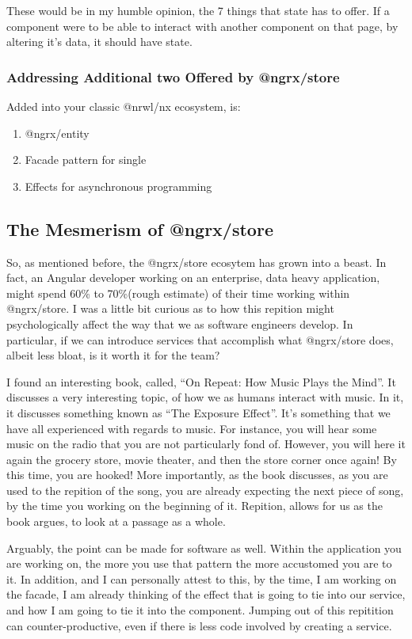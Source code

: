 These would be in my humble opinion, the 7 things that state has to offer. If a
component were to be able to interact with another component on that page, by
altering it's data, it should have state.

\subsubsection{ Addressing Additional two Offered by @ngrx/store }
Added into your classic @nrwl/nx ecosystem, is:
\begin{enumerate}
  \item @ngrx/entity
  \item Facade pattern for single
  \item Effects for asynchronous programming
\end{enumerate}

\subsection{The Mesmerism of @ngrx/store}

So, as mentioned before, the @ngrx/store ecosytem has grown into a beast. In
fact, an Angular developer working on an enterprise, data heavy application,
might spend 60\% to 70\%(rough estimate) of their time working within
@ngrx/store. I was a little bit curious as to how this repition might
psychologically affect the way that we as software engineers develop. In
particular, if we can introduce services that accomplish what @ngrx/store does,
albeit less bloat, is it worth it for the team?

I found an interesting book, called, ``On Repeat: How Music Plays the Mind''. It
discusses a very interesting topic, of how we as humans interact with music. In
it, it discusses something known as ``The Exposure Effect''. It's something that
we have all experienced with regards to music. For instance, you will hear some
music on the radio that you are not particularly fond of. However, you will here
it again the grocery store, movie theater, and then the store corner once again!
By this time, you are hooked! More importantly, as the book discusses, as you
are used to the repition of the song, you are already expecting the next piece
of song, by the time you working on the beginning of it. Repition, allows for us
as the book argues, to look at a passage as a whole.

Arguably, the point can be made for software as well. Within the application you
are working on, the more you use that pattern the more accustomed you are to it.
In addition, and I can personally attest to this, by the time, I am working on
the facade, I am already thinking of the effect that is going to tie into our
service, and how I am going to tie it into the component. Jumping out of this
repitition can counter-productive, even if there is less code involved by
creating a service.

